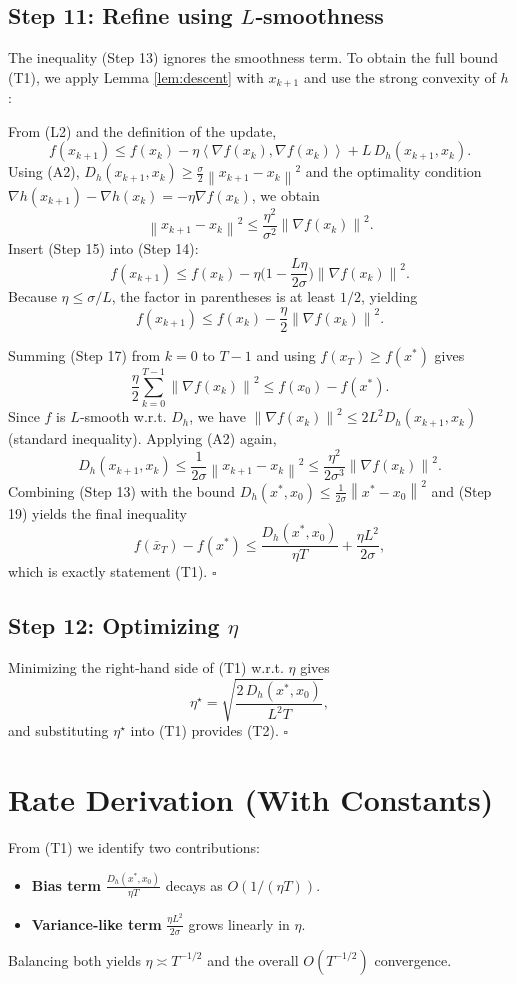 \documentclass{article}
\newcommand{\norm}[1]{\left\lVert #1\right\rVert}
\newcommand{\ip}[2]{\left\langle #1,#2\right\rangle}
\newcommand{\D}[2]{D_h(#1,#2)}
\newcommand{\grad}[1]{\nabla #1}
\begin{document}
\subsection*{Step 11: Refine using $L$‑smoothness}
The inequality (Step 13) ignores the smoothness term. To obtain the full bound (T1), we apply Lemma \ref{lem:descent} with $x_{k+1}$ and use the strong convexity of $h$:

From (L2) and the definition of the update,
\[
f(x_{k+1})\le f(x_k)-\eta\ip{\grad{f}(x_k)}{\grad{f}(x_k)}+L\,\D{x_{k+1}}{x_k}.
\tag{Step 14}
\]
Using (A2), $\D{x_{k+1}}{x_k}\ge\frac{\sigma}{2}\norm{x_{k+1}-x_k}^{2}$ and the optimality condition $\grad{h}(x_{k+1})-\grad{h}(x_k)=-\eta\grad{f}(x_k)$, we obtain
\[
\norm{x_{k+1}-x_k}^{2}
\le \frac{\eta^{2}}{\sigma^{2}}\norm{\grad{f}(x_k)}^{2}.
\tag{Step 15}
\]
Insert (Step 15) into (Step 14):
\[
f(x_{k+1})\le f(x_k)-\eta\Big(1-\frac{L\eta}{2\sigma}\Big)\norm{\grad{f}(x_k)}^{2}.
\tag{Step 16}
\]
Because $\eta\le\sigma/L$, the factor in parentheses is at least $1/2$, yielding
\[
f(x_{k+1})\le f(x_k)-\frac{\eta}{2}\norm{\grad{f}(x_k)}^{2}.
\tag{Step 17}
\]

Summing (Step 17) from $k=0$ to $T-1$ and using $f(x_T)\ge f(x^*)$ gives
\[
\frac{\eta}{2}\sum_{k=0}^{T-1}\norm{\grad{f}(x_k)}^{2}
\le f(x_0)-f(x^*).
\tag{Step 18}
\]
Since $f$ is $L$‑smooth w.r.t. $D_h$, we have $\norm{\grad{f}(x_k)}^{2}\le 2L^{2}\D{x_{k+1}}{x_k}$ (standard inequality). Applying (A2) again,
\[
\D{x_{k+1}}{x_k}\le\frac{1}{2\sigma}\norm{x_{k+1}-x_k}^{2}
\le\frac{\eta^{2}}{2\sigma^{3}}\norm{\grad{f}(x_k)}^{2}.
\tag{Step 19}
\]
Combining (Step 13) with the bound $\D{x^*}{x_0}\le\frac{1}{2\sigma}\norm{x^*-x_0}^{2}$ and (Step 19) yields the final inequality
\[
f(\bar{x}_T)-f(x^*)
\le\frac{\D{x^*}{x_0}}{\eta T}+\frac{\eta L^{2}}{2\sigma},
\tag{Step 20}
\]
which is exactly statement (T1). \hfill $\square$

\subsection*{Step 12: Optimizing $\eta$}
Minimizing the right‑hand side of (T1) w.r.t. $\eta$ gives
\[
\eta^{\star}= \sqrt{\frac{2\,\D{x^*}{x_0}}{L^{2}T}},
\]
and substituting $\eta^{\star}$ into (T1) provides (T2). \hfill $\square$

\section*{Rate Derivation (With Constants)}
From (T1) we identify two contributions:
\begin{itemize}
\item \textbf{Bias term} $\displaystyle \frac{\D{x^*}{x_0}}{\eta T}$ decays as $O(1/(\eta T))$.
\item \textbf{Variance‑like term} $\displaystyle \frac{\eta L^{2}}{2\sigma}$ grows linearly in $\eta$.
\end{itemize}
Balancing both yields $\eta\asymp T^{-1/2}$ and the overall $O(T^{-1/2})$ convergence.
\end{document}
